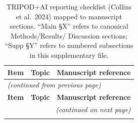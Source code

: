 \documentclass[11pt,a4paper]{article}
\begin{document}
\renewcommand{\arraystretch}{1.05}
\begin{longtable}{p{}p{}p{}}
\caption{TRIPOD+AI reporting checklist (Collins et al.\ 2024) mapped to
manuscript sections. ``Main \S X'' refers to canonical Methods/Results/
Discussion sections; ``Supp \S Y'' refers to numbered subsections in this
supplementary file.}
\label{tab:s8-tripod-checklist}\\
\toprule
\textbf{Item} & \textbf{Topic} & \textbf{Manuscript reference} \\
\midrule
\endfirsthead

\multicolumn{3}{l}{\small\textit{(continued from previous page)}} \\
\toprule
\textbf{Item} & \textbf{Topic} & \textbf{Manuscript reference} \\
\midrule
\endhead

\midrule
\multicolumn{3}{r}{\small\textit{(continued on next page)}} \\
\endfoot

\bottomrule
\endlastfoot


\end{longtable}
\end{document}
